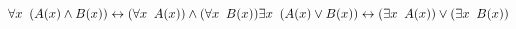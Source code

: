 \documentclass[14pt,border=2pt]{standalone}
\begin{document}
        $$
        \LARGE 

\forall x~ (A(x) \land B(x)) \leftrightarrow (\forall x~ A(x)) \land (\forall x~ B(x)) \\
\exists x~ (A(x) \lor B(x)) \leftrightarrow (\exists x~ A(x)) \lor (\exists x~ B(x)) 
        $$
        
\end{document}

